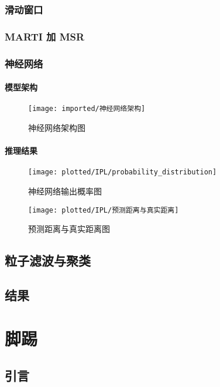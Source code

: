 \subsection{滑动窗口}

\subsection{MARTI 加 MSR}

\subsection{神经网络}
\subsubsection{模型架构}
\begin{figure}[htbp]
    \centering
    \texttt{[image: imported/神经网络架构]}
    \caption{\label{fig:IPL_network}神经网络架构图}
\end{figure}
\subsubsection{推理结果}
\begin{figure}[htbp]
    \centering
    \texttt{[image: plotted/IPL/probability\_distribution]}
    \caption{\label{fig:probability_distribution}神经网络输出概率图}
\end{figure}


\begin{figure}[htbp]
    \centering
    \texttt{[image: plotted/IPL/预测距离与真实距离]}
    \caption{\label{fig:probability_distribution}预测距离与真实距离图}
\end{figure}

\section{粒子滤波与聚类}

\section{结果}


\chapter{脚踢}

\section{引言}

